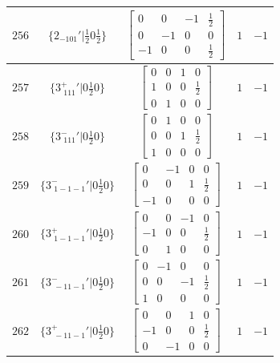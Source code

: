 \documentclass[fleqn,8pt]{jsarticle}
\begin{document}
\begin{longtable}{ccccc}
$ 256 $ & $ \{2{}_{-101}{}'|\frac{1}{2} 0 \frac{1}{2}\} $ & $ \begin{bmatrix} 0 & 0 & -1 & \frac{1}{2} \\ 0 & -1 & 0 & 0 \\ -1 & 0 & 0 & \frac{1}{2} \end{bmatrix} $ & $ 1 $ & $ -1 $ \\ \hline
$ 257 $ & $ \{3^{+}_{\,\,111}{}'|0 \frac{1}{2} 0\} $ & $ \begin{bmatrix} 0 & 0 & 1 & 0 \\ 1 & 0 & 0 & \frac{1}{2} \\ 0 & 1 & 0 & 0 \end{bmatrix} $ & $ 1 $ & $ -1 $ \\ \hline
$ 258 $ & $ \{3^{-}_{\,\,111}{}'|0 \frac{1}{2} 0\} $ & $ \begin{bmatrix} 0 & 1 & 0 & 0 \\ 0 & 0 & 1 & \frac{1}{2} \\ 1 & 0 & 0 & 0 \end{bmatrix} $ & $ 1 $ & $ -1 $ \\ \hline
$ 259 $ & $ \{3^{-}_{\,\,1-1-1}{}'|0 \frac{1}{2} 0\} $ & $ \begin{bmatrix} 0 & -1 & 0 & 0 \\ 0 & 0 & 1 & \frac{1}{2} \\ -1 & 0 & 0 & 0 \end{bmatrix} $ & $ 1 $ & $ -1 $ \\ \hline
$ 260 $ & $ \{3^{+}_{\,\,1-1-1}{}'|0 \frac{1}{2} 0\} $ & $ \begin{bmatrix} 0 & 0 & -1 & 0 \\ -1 & 0 & 0 & \frac{1}{2} \\ 0 & 1 & 0 & 0 \end{bmatrix} $ & $ 1 $ & $ -1 $ \\ \hline
$ 261 $ & $ \{3^{-}_{\,\,-11-1}{}'|0 \frac{1}{2} 0\} $ & $ \begin{bmatrix} 0 & -1 & 0 & 0 \\ 0 & 0 & -1 & \frac{1}{2} \\ 1 & 0 & 0 & 0 \end{bmatrix} $ & $ 1 $ & $ -1 $ \\ \hline
$ 262 $ & $ \{3^{+}_{\,\,-11-1}{}'|0 \frac{1}{2} 0\} $ & $ \begin{bmatrix} 0 & 0 & 1 & 0 \\ -1 & 0 & 0 & \frac{1}{2} \\ 0 & -1 & 0 & 0 \end{bmatrix} $ & $ 1 $ & $ -1 $ \\ \hline

\end{longtable}
\end{document}

